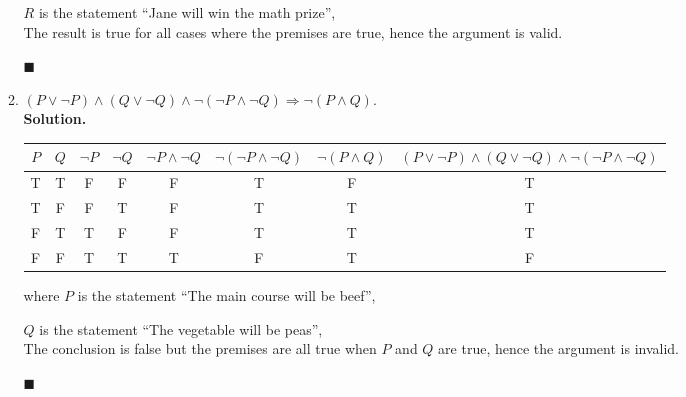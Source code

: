 \documentclass{report}
\newcommand{\sol}{\vspace{1em}\\\textbf{Solution.}\vspace{0.5em}}
\newcommand{\qed}{\ \\\strut\hfill$\blacksquare$\vspace{1em}}
\begin{document}
\begin{enumerate}[leftmargin=*]
\begin{enumerate}
                    $R$ is the statement ``Jane will win the math prize'',\\

                    The result is true for all cases where the premises are true, hence the
                    argument is valid.\qed

              \item $(P \vee \neg P) \wedge (Q \vee \neg Q)
                        \wedge \neg(\neg P \wedge \neg Q) \Rightarrow \neg(P \wedge Q)$.
                    \sol{}
                    \begin{center}
                        \begin{tabular}{cccccccc}
                            $P$ & $Q$ & $\neg P$ & $\neg Q$ & $\neg P \wedge \neg Q$ & $\neg(\neg P \wedge \neg Q)$ & $\neg(P \wedge Q)$ & $(P \vee \neg P) \wedge (Q \vee \neg Q) \wedge \neg(\neg P \wedge \neg Q)$ \\
                            \hline
                            T   & T   & F        & F        & F                      & T                            & F                  & T                                                                          \\
                            T   & F   & F        & T        & F                      & T                            & T                  & T                                                                          \\
                            F   & T   & T        & F        & F                      & T                            & T                  & T                                                                          \\
                            F   & F   & T        & T        & T                      & F                            & T                  & F
                        \end{tabular}
                    \end{center}
                    where $P$ is the statement ``The main course will be beef'',

                    $Q$ is the statement ``The vegetable will be peas'',\\

                    The conclusion is false but the premises are all true when $P$ and $Q$ are
                    true, hence the argument is invalid.\qed


\end{enumerate}
\end{enumerate}
\end{document}
